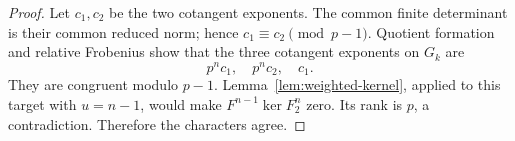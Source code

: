\begin{proof}
Let $c_1,c_2$ be the two cotangent exponents. The common finite determinant is their common reduced norm; hence $c_1\equiv c_2\pmod{p-1}$. Quotient formation and relative Frobenius show that the three cotangent exponents on $G_k$ are
\[
                         p^nc_1,\quad p^nc_2,\quad c_1.
\]
They are congruent modulo $p-1$. Lemma~\ref{lem:weighted-kernel}, applied to this target with $u=n-1$, would make $F^{n-1}\ker F_2^n$ zero. Its rank is $p$, a contradiction. Therefore the characters agree.
\end{proof}
